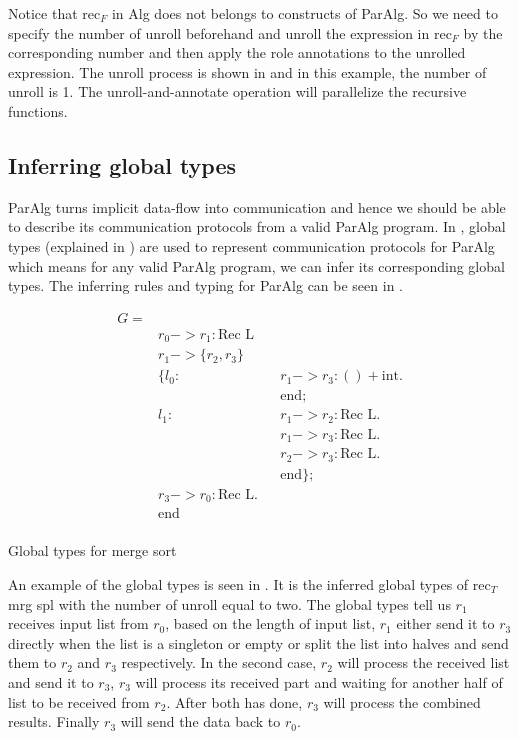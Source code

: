 Notice that $\text{rec}_F$ in Alg does not belongs to constructs of ParAlg. So we need to specify the number of unroll beforehand and unroll the expression in $\text{rec}_F$ by the corresponding number and then apply the role annotations to the unrolled expression. The unroll process is shown in  and in this example, the number of unroll is 1. The unroll-and-annotate operation will parallelize the recursive functions.
\subsection{Inferring global types}
ParAlg turns implicit data-flow into communication and hence we should be able to describe its communication protocols from a valid ParAlg program. In \cite{AlgebraicMultipartyProtocol}, global types (explained in ) are used to represent communication protocols for ParAlg which means for any valid ParAlg program, we can infer its corresponding global types. The inferring rules and typing for ParAlg can be seen in \cite{AlgebraicMultipartyProtocol}. 
\begin{listing}[ht]
    \begin{align*}
       G = \\ 
       & r_0 -> r_1: \text{Rec L} \\
       & r_1 -> \{r_2, r_3\}\\
       & \{ l_0 : && r_1 -> r_3 : () + \text{int}.\\
       & && \text{end};\\
       &  l_1 : && r_1 -> r_2 : \text{Rec L}.\\
       &           && r_1 -> r_3 : \text{Rec L}.\\
       &           && r_2 -> r_3 : \text{Rec L}.\\
       &           && \text{end} \}; \\
       & r_3 -> r_0 : \text{Rec L}.\\
       & \text{end}\\
    \end{align*}
    \caption{Global types for merge sort}
    \label{project:code:ms2}
\end{listing}

An example of the global types is seen in . It is the inferred global types of $\text{rec}_T$ mrg spl with the number of unroll equal to two. The global types tell us $r_1$ receives input list from $r_0$, based on the length of input list, $r_1$ either send it to $r_3$ directly when the list is a singleton or empty or split the list into halves and send them to $r_2$ and $r_3$ respectively. In the second case, $r_2$ will process the received list and send it to $r_3$, $r_3$ will process its received part and waiting for another half of list to be received from $r_2$. After both has done, $r_3$ will process the combined results. Finally $r_3$ will send the data back to $r_0$.
